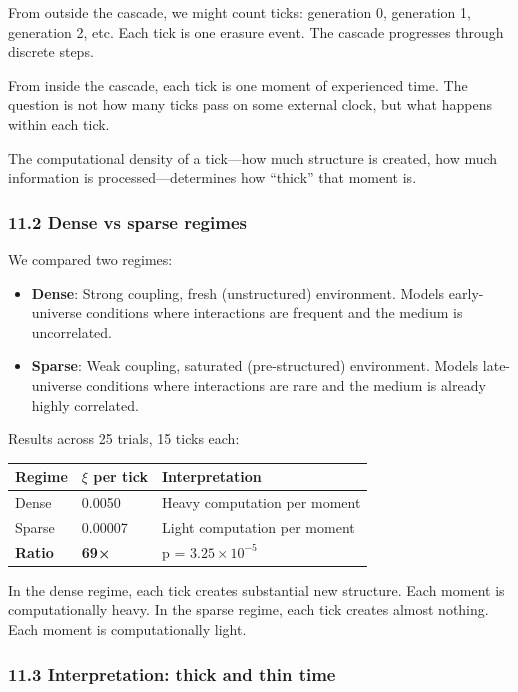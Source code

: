 \documentclass[
  11pt,
  a4paper]{article}
\providecommand{\tightlist}{%
  \setlength{\itemsep}{0pt}\setlength{\parskip}{0pt}}
\begin{document}
From outside the cascade, we might count ticks: generation 0, generation
1, generation 2, etc. Each tick is one erasure event. The cascade
progresses through discrete steps.

From inside the cascade, each tick is one moment of experienced time.
The question is not how many ticks pass on some external clock, but what
happens within each tick.

The computational density of a tick---how much structure is created, how
much information is processed---determines how ``thick'' that moment is.

\subsubsection{11.2 Dense vs sparse
regimes}\label{dense-vs-sparse-regimes}

We compared two regimes:

\begin{itemize}
\tightlist
\item
  \textbf{Dense}: Strong coupling, fresh (unstructured) environment.
  Models early-universe conditions where interactions are frequent and
  the medium is uncorrelated.
\item
  \textbf{Sparse}: Weak coupling, saturated (pre-structured)
  environment. Models late-universe conditions where interactions are
  rare and the medium is already highly correlated.
\end{itemize}

Results across 25 trials, 15 ticks each:

\begin{longtable}[]{@{}lll@{}}
\toprule\noalign{}
Regime & \(\xi\) per tick & Interpretation \\
\midrule\noalign{}
\endhead
\bottomrule\noalign{}
\endlastfoot
Dense & 0.0050 & Heavy computation per moment \\
Sparse & 0.00007 & Light computation per moment \\
\textbf{Ratio} & \textbf{69×} & p = \(3.25 \times 10^{-5}\) \\
\end{longtable}

In the dense regime, each tick creates substantial new structure. Each
moment is computationally heavy. In the sparse regime, each tick creates
almost nothing. Each moment is computationally light.

\subsubsection{11.3 Interpretation: thick and thin
time}\label{interpretation-thick-and-thin-time}
\end{document}

